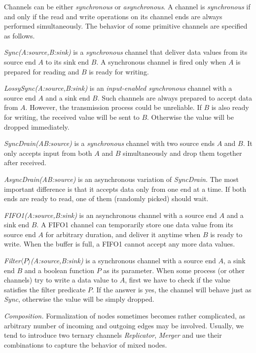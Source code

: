Channels can be either \emph{synchronous} or \emph{asynchronous}. A channel is \emph{synchronous} if and only if the read and write operations on its channel ends are always performed simultaneously. The behavior of some primitive channels are specified as follows.

\begin{description}
    \item \emph{Sync(A:source,B:sink)} is a \emph{synchronous} channel that deliver data values from its source end $A$ to its sink end $B$. A synchronous channel is fired only when $A$ is prepared for reading and $B$ is ready for writing. 
    \item \emph{LossySync(A:source,B:sink)}
    is an \emph{input-enabled synchronous} channel with a source end $A$ and a sink end $B$. Such channels are always prepared to accept data from $A$. However, the transmission process could be unreliable. If $B$ is also ready for writing, the received value will be sent to $B$. Otherwise the value will be dropped immediately.
    \item \emph{SyncDrain(A\:B:source)} is a \emph{synchronous} channel with two source ends $A$ and $B$. It only accepts input from both $A$ and $B$ simultaneously and drop them together after received.
    \item \emph{AsyncDrain(A\:B:source)} is an asynchronous variation of \emph{SyncDrain}. The most important difference is that it accepts data only from one end at a time. If both ends are ready to read, one of them (randomly picked) should wait.
    \item \emph{FIFO1(A:source,B:sink)} is an asynchronous channel with a source end $A$ and a sink end $B$. A FIFO1 channel can temporarily store one data value from its source end $A$ for arbitrary duration, and deliver it anytime when $B$ is ready to write. When the buffer is full, a FIFO1 cannot accept any more data values.
    \item \emph{Filter$\langle P\rangle$(A:source,B:sink)}
    is a synchronous channel with a source end $A$, a sink end $B$ and a boolean function $P$ as its parameter. When some process (or other channels) try to write a data value to $A$, first we have to check if the value satisfies the filter predicate $P$. If the answer is yes, the channel will behave just as \emph{Sync}, otherwise the value will be simply dropped.
\end{description}

\noindent\emph{Composition.} Formalization of nodes sometimes becomes rather complicated, as arbitrary number of incoming and outgoing edges may be involved. Usually, we tend to introduce two ternary channels \emph{Replicator}, \emph{Merger} and use their combinations to capture the behavior of mixed nodes.

